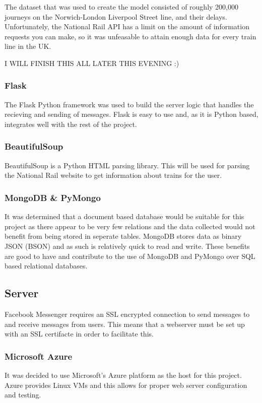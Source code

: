 \documentclass[12pt,a4paper]{article}
\begin{document}
    The dataset that was used to create the model consisted of roughly 200,000 journeys on the Norwich-London Liverpool Street line, and their delays. Unfortunately, the National Rail API has a limit on the amount of information requests you can make, so it was unfeasable to attain enough data for every train line in the UK.
    
    I WILL FINISH THIS ALL LATER THIS EVENING :)
    
    
    \subsubsection{Flask}
    The Flask Python framework was used to build the server logic that handles the recieving and sending of messages. Flask is easy to use and, as it is Python based, integrates well with the rest of the project.
    
    \subsubsection{BeautifulSoup}
    \label{subsubsection:BeautifulSoup}
    BeautifulSoup is a Python HTML parsing library. This will be used for parsing the National Rail website to get information about trains for the user.
    
    \subsubsection{MongoDB \& PyMongo}
    \label{subsubsection:mongodb}
    It was determined that a document based database would be suitable for this project as there appear to be very few relations and the data collected would not benefit from being stored in seperate tables. MongoDB stores data as binary JSON (BSON) \citep{korneliusz_2014} and as such is relatively quick to read and write. These benefits are good to have and contribute to the use of MongoDB and PyMongo over SQL based relational databases.
    
    \subsection{Server}
    \label{subsection:Server}
    Facebook Messenger requires an SSL encrypted connection to send messages to and receive messages from users. This means that a webserver must be set up with an SSL certifacte in order to facilitate this.
    \subsubsection{Microsoft Azure}
    It was decided to use Microsoft's Azure platform as the host for this project. Azure provides Linux VMs and this allows for proper web server configuration and testing.
    
\end{document}

